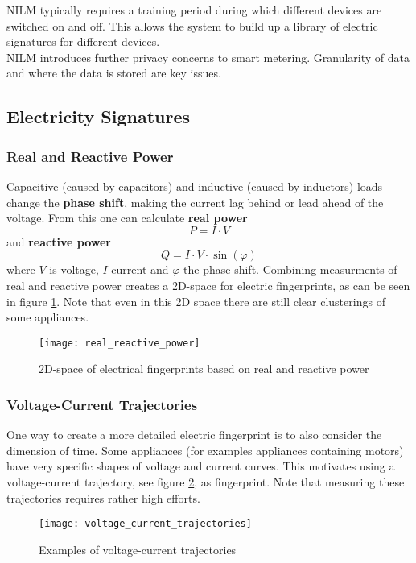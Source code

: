 NILM typically requires a training period during which different devices are switched on and off.
This allows the system to build up a library of electric signatures for different devices.\\

NILM introduces further privacy concerns to smart metering.
Granularity of data and where the data is stored are key issues.

\subsection{Electricity Signatures}
\label{sec:electric_fingerprints}

\subsubsection{Real and Reactive Power}
Capacitive (caused by capacitors) and inductive (caused by inductors) loads change the \textbf{phase shift}, making the current lag behind or lead ahead of the voltage.
From this one can calculate \textbf{real power}
$$
P = I \cdot V
$$
and \textbf{reactive power}
$$
Q = I \cdot V \cdot \sin(\varphi)
$$
where $V$ is voltage, $I$ current and $\varphi$ the phase shift.
Combining measurments of real and reactive power creates a 2D-space for electric fingerprints, as can be seen in figure \ref{fig:real_reactive_power}.
Note that even in this 2D space there are still clear clusterings of some appliances.

\begin{figure}
    \centering
    \texttt{[image: real\_reactive\_power]}
    \caption{2D-space of electrical fingerprints based on real and reactive power}
    \label{fig:real_reactive_power}
\end{figure}

\subsubsection{Voltage-Current Trajectories}
One way to create a more detailed electric fingerprint is to also consider the dimension of time.
Some appliances (for examples appliances containing motors) have very specific shapes of voltage and current curves.
This motivates using a voltage-current trajectory, see figure \ref{fig:voltage_current_trajectories}, as fingerprint.
Note that measuring these trajectories requires rather high efforts.

\begin{figure}
    \centering
    \texttt{[image: voltage\_current\_trajectories]}
    \caption{Examples of voltage-current trajectories}
    \label{fig:voltage_current_trajectories}
\end{figure}

